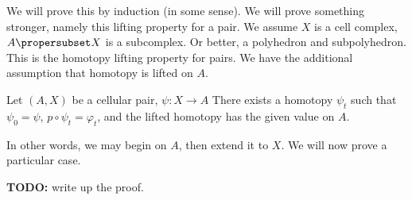 We will prove this by induction (in some sense). We will prove
something stronger, namely this lifting property for a pair. We
assume $X$ is a cell complex, $A\propersubset X$ is a
subcomplex. Or better, a polyhedron and subpolyhedron. This is
the homotopy lifting property for pairs. We have the additional
assumption that homotopy is lifted on $A$.

\begin{thm}
Let $(A,X)$ be a cellular pair, $\psi\colon X\to A$
There exists a homotopy $\psi_t$ such that $\psi_0=\psi$,
$p\circ\psi_t=\varphi_t$, and the lifted homotopy has the given
value on $A$.
\end{thm}

In other words, we may begin on $A$, then extend it to $X$. We
will now prove a particular case.

\bigskip
\noindent\textbf{TODO:} write up the proof.
